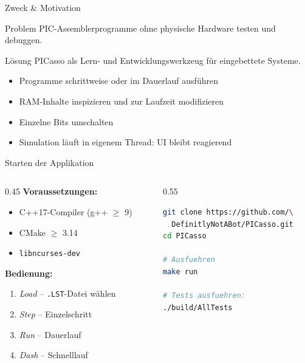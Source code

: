 \documentclass[10pt]{beamer}
\begin{document}
\begin{frame}{Zweck \& Motivation}
    \begin{block}{Problem}
        PIC-Assemblerprogramme ohne physische Hardware testen und debuggen.
    \end{block}
    \vspace{0.5em}
    \begin{block}{Lösung}
        PICasso als Lern- und Entwicklungswerkzeug für eingebettete Systeme.
    \end{block}
    \vspace{0.5em}
    \begin{itemize}
        \item Programme schrittweise oder im Dauerlauf ausführen
        \item RAM-Inhalte inspizieren und zur Laufzeit modifizieren
        \item Einzelne Bits umschalten
        \item Simulation läuft in eigenem Thread: UI bleibt reagierend
    \end{itemize}
\end{frame}

\begin{frame}[fragile]{Starten der Applikation}
    \begin{columns}
        \begin{column}{0.45\textwidth}
            \textbf{Voraussetzungen:}
            \begin{itemize}
                \item C++17-Compiler (g++ $\ge$ 9)
                \item CMake $\ge$ 3.14
                \item \texttt{libncurses-dev}
            \end{itemize}
            \vspace{0.8em}
            \textbf{Bedienung:}
            \begin{enumerate}
                \item \emph{Load} -- \texttt{.LST}-Datei wählen
                \item \emph{Step} -- Einzelschritt
                \item \emph{Run} -- Dauerlauf
                \item \emph{Dash} -- Schnelllauf
            \end{enumerate}
        \end{column}
        \begin{column}{0.55\textwidth}
\begin{lstlisting}[language=bash, caption={Build \& Start}]
git clone https://github.com/\
  DefinitlyNotABot/PICasso.git
cd PICasso

# Ausfuehren
make run

# Tests ausfuehren:
./build/AllTests
\end{lstlisting}
        \end{column}
    \end{columns}
\end{frame}
\end{document}
